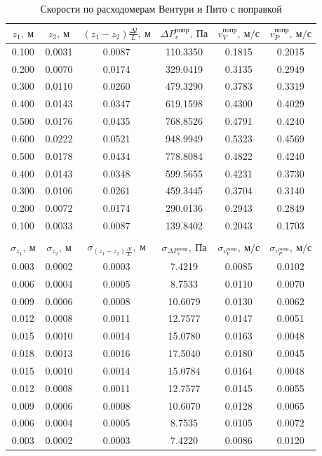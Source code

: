 \documentclass[a4paper, 12pt]{article}
\begin{document}
\renewcommand{\arraystretch}{1.3} 
\begin{table}[h!]
       
        \begin{center}
         \begin{tabular}{|c|c|c|c|c|c|}
            \hline
 $z_1, \: м$ & $z_2, \: м$ & $(z_1 - z_2) \frac{\Delta l}{L}, \: м $  & $\Delta P_v^{попр}, \: Па$ & $v_V^{попр}, \: м/с$ & $v_P^{попр}, \: м/с$ \\
 \hline
 0.100 & 0.0031 & 0.0087 & 110.3350 & 0.1815 & 0.2015 \\
\hline
 0.200 & 0.0070 & 0.0174 & 329.0419 & 0.3135 & 0.2949 \\
\hline
 0.300 & 0.0110 & 0.0260 & 479.3290 & 0.3783 & 0.3319 \\
\hline
 0.400 & 0.0143 & 0.0347 & 619.1598 & 0.4300 & 0.4029 \\
\hline
 0.500 & 0.0176 & 0.0435 & 768.8526 & 0.4791 & 0.4240 \\
\hline
 0.600 & 0.0222 & 0.0521 & 948.9949 & 0.5323 & 0.4569 \\
\hline
 0.500 & 0.0178 & 0.0434 & 778.8084 & 0.4822 & 0.4240 \\
\hline
 0.400 & 0.0143 & 0.0348 & 599.5655 & 0.4231 & 0.3730 \\
\hline
 0.300 & 0.0106 & 0.0261 & 459.3445 & 0.3704 & 0.3140 \\
\hline
 0.200 & 0.0072 & 0.0174 & 290.0136 & 0.2943 & 0.2849 \\
\hline
 0.100 & 0.0033 & 0.0087 & 139.8402 & 0.2043 & 0.1703 \\
\hline
\multicolumn{6}{|c|}{}\\
\hline
 $\sigma_{z_1}, \: м$ & $\sigma_{z_2}, \: м$ & $\sigma_{(z_1 - z_2) \frac{\Delta l}{L}}, \: м $  & $\sigma_{\Delta P_v^{попр}}, \: Па$ & $\sigma_{v_V^{попр}}, \: м/с$ & $\sigma_{v_P^{попр}}, \: м/с$ \\
 \hline
 0.003 & 0.0002 & 0.0003 & 7.4219 & 0.0085 & 0.0102 \\
\hline
 0.006 & 0.0004 & 0.0005 & 8.7533 & 0.0110 & 0.0070 \\
\hline
 0.009 & 0.0006 & 0.0008 & 10.6079 & 0.0130 & 0.0062 \\
\hline
 0.012 & 0.0008 & 0.0011 & 12.7577 & 0.0147 & 0.0051 \\
\hline
 0.015 & 0.0010 & 0.0014 & 15.0780 & 0.0163 & 0.0048 \\
\hline
 0.018 & 0.0013 & 0.0016 & 17.5040 & 0.0180 & 0.0045 \\
\hline
 0.015 & 0.0010 & 0.0014 & 15.0784 & 0.0164 & 0.0048 \\
\hline
 0.012 & 0.0008 & 0.0011 & 12.7577 & 0.0145 & 0.0055 \\
\hline
 0.009 & 0.0006 & 0.0008 & 10.6070 & 0.0128 & 0.0065 \\
\hline
 0.006 & 0.0004 & 0.0005 & 8.7535 & 0.0105 & 0.0072 \\
\hline
 0.003 & 0.0002 & 0.0003 & 7.4220 & 0.0086 & 0.0120 \\
\hline
 \end{tabular}
         \end{center}
         \caption{Скорости по расходомерам Вентури и Пито с поправкой}
\end{table}
\end{document}
